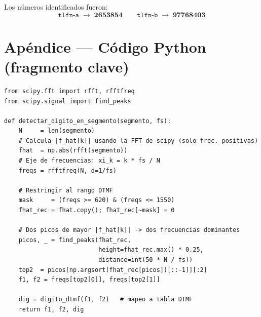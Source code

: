 \documentclass[]{report}
\begin{document}
Los números identificados fueron:
\[
\texttt{tlfn-a} \;\rightarrow\; \mathbf{2653854} \qquad
\texttt{tlfn-b} \;\rightarrow\; \mathbf{97768403}
\]

\appendix
\section*{Apéndice — Código Python (fragmento clave)}

\begin{lstlisting}[caption={DFT vía FFT de scipy y detección de picos.}]
from scipy.fft import rfft, rfftfreq
from scipy.signal import find_peaks

def detectar_digito_en_segmento(segmento, fs):
    N     = len(segmento)
    # Calcula |f_hat[k]| usando la FFT de scipy (solo frec. positivas)
    fhat  = np.abs(rfft(segmento))
    # Eje de frecuencias: xi_k = k * fs / N
    freqs = rfftfreq(N, d=1/fs)

    # Restringir al rango DTMF
    mask     = (freqs >= 620) & (freqs <= 1550)
    fhat_rec = fhat.copy(); fhat_rec[~mask] = 0

    # Dos picos de mayor |f_hat[k]| -> dos frecuencias dominantes
    picos, _ = find_peaks(fhat_rec,
                          height=fhat_rec.max() * 0.25,
                          distance=int(50 * N / fs))
    top2  = picos[np.argsort(fhat_rec[picos])[::-1]][:2]
    f1, f2 = freqs[top2[0]], freqs[top2[1]]

    dig = digito_dtmf(f1, f2)   # mapeo a tabla DTMF
    return f1, f2, dig
\end{lstlisting}
\end{document}

